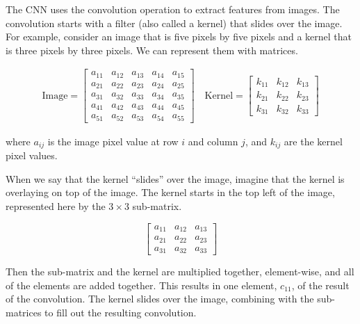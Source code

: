 The CNN uses the convolution operation to extract features from images. The convolution starts with a filter (also called a kernel) that slides over the image. For example, consider an image that is five pixels by five pixels and a kernel that is three pixels by three pixels. We can represent them with matrices.

\begin{align}
    \text{Image}=
    \begin{bmatrix}
        a_{11} & a_{12} & a_{13} & a_{14} & a_{15} \\
        a_{21} & a_{22} & a_{23} & a_{24} & a_{25} \\
        a_{31} & a_{32} & a_{33} & a_{34} & a_{35} \\
        a_{41} & a_{42} & a_{43} & a_{44} & a_{45} \\
        a_{51} & a_{52} & a_{53} & a_{54} & a_{55}
    \end{bmatrix}
    \quad
    \text{Kernel}=
    \begin{bmatrix}
        k_{11} & k_{12} & k_{13} \\
        k_{21} & k_{22} & k_{23} \\
        k_{31} & k_{32} & k_{33}
    \end{bmatrix}
\end{align}

\noindent where $a_{ij}$ is the image pixel value at row $i$ and column $j$, and $k_{ij}$ are the kernel pixel values.

When we say that the kernel ``slides'' over the image, imagine that the kernel is overlaying on top of the image. The kernel starts in the top left of the image, represented here by the $3 \times 3$ sub-matrix.

\begin{equation*}
    \begin{bmatrix}
        a_{11} & a_{12} & a_{13}\\
        a_{21} & a_{22} & a_{23}\\
        a_{31} & a_{32} & a_{33}
    \end{bmatrix}
\end{equation*}

\noindent Then the sub-matrix and the kernel are multiplied together, element-wise, and all of the elements are added together. This results in one element, $c_{11}$, of the result of the convolution. The kernel slides over the image, combining with the sub-matrices to fill out the resulting convolution.

